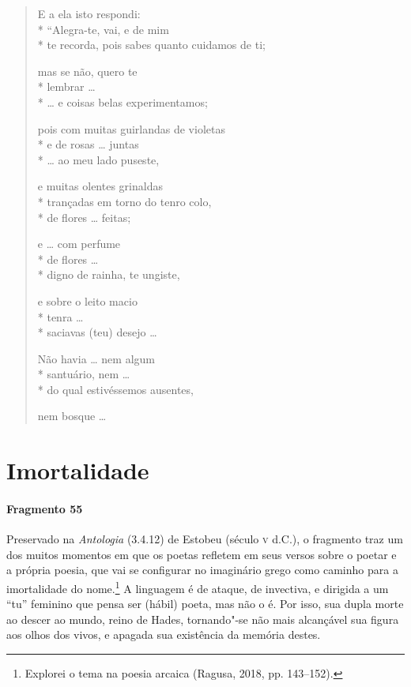 {\begin{verse}
E a ela isto respondi:\\*
“Alegra-te, vai, e de mim\\*
te recorda, pois sabes quanto cuidamos de ti;

mas se não, quero te\\*
lembrar \ldots{}\\*
\ldots{} e coisas belas experimentamos;

pois com muitas guirlandas de violetas\\*
e de rosas \ldots{} juntas\\*
\ldots{} ao meu lado puseste,			%

e muitas olentes grinaldas\\*
trançadas em torno do tenro colo, \\*
de flores \ldots{} feitas;

e \ldots{} com perfume\\*
de flores \ldots{}\\*
digno de rainha, te ungiste,

e sobre o leito macio\\*
tenra \ldots{}\\*
saciavas (teu) desejo \ldots{}

Não havia \ldots{} nem algum\\*
santuário, nem \ldots{}\\*
do qual estivéssemos ausentes,

nem bosque \ldots{}
\end{verse}


\section{Imortalidade}

\paragraph{Fragmento 55}

{\small Preservado na \textit{Antologia} (3.4.12) de Estobeu (século \textsc{v} d.C.), o fragmento traz um dos muitos momentos em que os poetas refletem em seus versos
sobre o poetar e a própria poesia, que vai se configurar no imaginário grego
como caminho para a imortalidade do nome.\footnote{Explorei o tema na poesia arcaica (Ragusa, 2018, pp. 143--152).} A linguagem é de ataque, de
invectiva, e dirigida a um “tu” feminino que pensa ser (hábil) poeta, mas
não o é. Por isso, sua dupla morte ao descer ao mundo, reino de
Hades, tornando"-se não mais alcançável sua figura aos olhos dos vivos, e
apagada sua existência da memória destes.}

}
